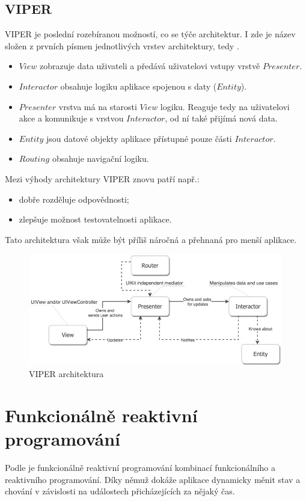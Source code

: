 \documentclass[thesis=M,czech]{FITthesis}[2012/06/26]
\begin{document}
\subsection{VIPER}
VIPER je poslední rozebíranou možností, co se týče architektur. I zde je název složen z prvních písmen jednotlivých vrstev architektury, tedy .
\begin{itemize}
\item $View$  zobrazuje data uživateli a předává uživatelovi vstupy vrstvě $Presenter$.
\item $Interactor$ obsahuje logiku aplikace spojenou s daty ($Entity$).
\item $Presenter$ vrstva má na starosti $View$ logiku.  Reaguje tedy na uživatelovi akce a komunikuje s vrstvou $Interactor$, od ní také přijímá nová data. \cite{Orlov}
\item $Entity$ jsou datové objekty aplikace přístupné pouze části $Interactor$.
\item $Routing$ obsahuje navigační logiku. \cite{VIPER}
\end{itemize}

Mezi výhody architektury VIPER znovu patří např.:
\begin{itemize}
\item dobře rozděluje odpovědnosti;
\item zlepšuje možnost testovatelnosti aplikace. \cite{Orlov}
\end{itemize}

Tato architektura však může být příliš náročná a přehnaná pro menší aplikace. \cite{Orlov}

\begin{figure}[h]\centering
 \includegraphics[width=0.99\textwidth]{./pictures/architektury/viper.jpg}
 \caption[VIPER architektura]{VIPER architektura \cite{viper-pic}}\label{fig:viper}
\end{figure}

\section{Funkcionálně reaktivní programování}
Podle \cite{technopediaFRP} je funkcionálně reaktivní programování kombinací funkcionálního a reaktivního programování. Díky němuž dokáže aplikace dynamicky měnit stav a chování v závislosti na událostech přicházejících za nějaký čas.
\end{document}
